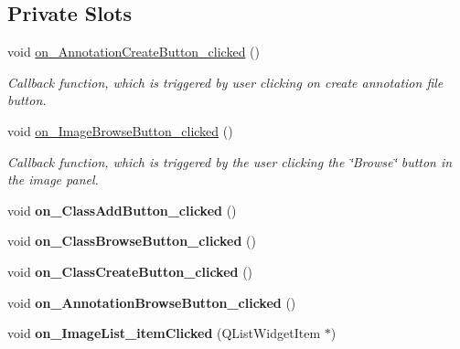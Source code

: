 \subsection*{Private Slots}
\begin{DoxyCompactItemize}
\item 
\mbox{\label{classMainView_af0436aa7323ec0580616b33adc219784}} 
void \hyperlink{classMainView_af0436aa7323ec0580616b33adc219784}{on\+\_\+\+Annotation\+Create\+Button\+\_\+clicked} ()
\begin{DoxyCompactList}\small\item\em Callback function, which is triggered by user clicking on create annotation file button. \end{DoxyCompactList}\item 
\mbox{\label{classMainView_a8e170aa23a65f1c7f3ed3a7c08a99101}} 
void \hyperlink{classMainView_a8e170aa23a65f1c7f3ed3a7c08a99101}{on\+\_\+\+Image\+Browse\+Button\+\_\+clicked} ()
\begin{DoxyCompactList}\small\item\em Callback function, which is triggered by the user clicking the \char`\"{}\+Browse\char`\"{} button in the image panel. \end{DoxyCompactList}\item 
\mbox{\label{classMainView_aaa6cd08b912bcc873f9a7c04258f98bb}} 
void {\bfseries on\+\_\+\+Class\+Add\+Button\+\_\+clicked} ()
\item 
\mbox{\label{classMainView_a67267813d7c408d32be5e6fef2251a6f}} 
void {\bfseries on\+\_\+\+Class\+Browse\+Button\+\_\+clicked} ()
\item 
\mbox{\label{classMainView_a3edf1fc4556c571b3d2130db22da504e}} 
void {\bfseries on\+\_\+\+Class\+Create\+Button\+\_\+clicked} ()
\item 
\mbox{\label{classMainView_a4995ea260acd3abf8ac31f148f2415ca}} 
void {\bfseries on\+\_\+\+Annotation\+Browse\+Button\+\_\+clicked} ()
\item 
\mbox{\label{classMainView_a21afbf21cbe8fc3e444d57cd575e69b0}} 
void {\bfseries on\+\_\+\+Image\+List\+\_\+item\+Clicked} (Q\+List\+Widget\+Item $\ast$)

\end{DoxyCompactItemize}
